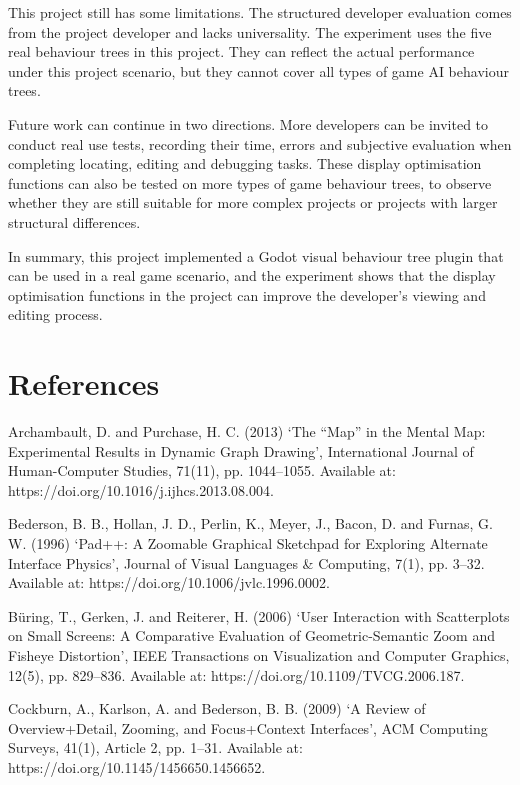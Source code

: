 \documentclass[11pt,a4paper,oneside,extrafontsizes]{memoir}
\begin{document}
This project still has some limitations. The structured developer evaluation comes from the project developer and lacks universality. The experiment uses the five real behaviour trees in this project. They can reflect the actual performance under this project scenario, but they cannot cover all types of game AI behaviour trees.

Future work can continue in two directions. More developers can be invited to conduct real use tests, recording their time, errors and subjective evaluation when completing locating, editing and debugging tasks. These display optimisation functions can also be tested on more types of game behaviour trees, to observe whether they are still suitable for more complex projects or projects with larger structural differences.

In summary, this project implemented a Godot visual behaviour tree plugin that can be used in a real game scenario, and the experiment shows that the display optimisation functions in the project can improve the developer's viewing and editing process.

\chapter*{References}

Archambault, D. and Purchase, H. C. (2013) ‘The “Map” in the Mental Map: Experimental Results in Dynamic Graph Drawing’, International Journal of Human-Computer Studies, 71(11), pp. 1044–1055. Available at: https://doi.org/10.1016/j.ijhcs.2013.08.004.

Bederson, B. B., Hollan, J. D., Perlin, K., Meyer, J., Bacon, D. and Furnas, G. W. (1996) ‘Pad++: A Zoomable Graphical Sketchpad for Exploring Alternate Interface Physics’, Journal of Visual Languages \& Computing, 7(1), pp. 3–32. Available at: https://doi.org/10.1006/jvlc.1996.0002.

Büring, T., Gerken, J. and Reiterer, H. (2006) ‘User Interaction with Scatterplots on Small Screens: A Comparative Evaluation of Geometric-Semantic Zoom and Fisheye Distortion’, IEEE Transactions on Visualization and Computer Graphics, 12(5), pp. 829–836. Available at: https://doi.org/10.1109/TVCG.2006.187.

Cockburn, A., Karlson, A. and Bederson, B. B. (2009) ‘A Review of Overview+Detail, Zooming, and Focus+Context Interfaces’, ACM Computing Surveys, 41(1), Article 2, pp. 1–31. Available at: https://doi.org/10.1145/1456650.1456652.
\end{document}
